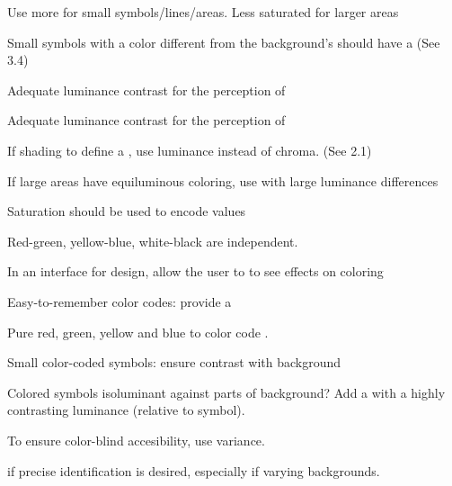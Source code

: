 \begin{compactenum}

    \item Use more  for small symbols/lines/areas. Less
        saturated for larger areas

    \item Small symbols with a color different from the background's should
        have a  (See 3.4)

    \item Adequate luminance contrast for the perception of 

    \item Adequate luminance contrast for the perception of 

    \item If shading to define a , use luminance instead
        of chroma. (See 2.1)

    \item If large areas have equiluminous coloring, use  with
        large luminance differences

    \item Saturation should be used to encode  values

    \item Red-green, yellow-blue, white-black are independent.

    \item In an interface for design, allow the user to  to
        see effects on coloring

    \item Easy-to-remember color codes: provide a 

    \item Pure red, green, yellow and blue to color code .

    \item Small color-coded symbols: ensure  contrast
        with background

    \item Colored symbols isoluminant against parts of background? Add a
         with a highly contrasting luminance (relative to symbol).

    \item To ensure color-blind accesibility, use  variance.

    \item {} if precise identification is desired,
        especially if varying backgrounds.


\end{compactenum}
